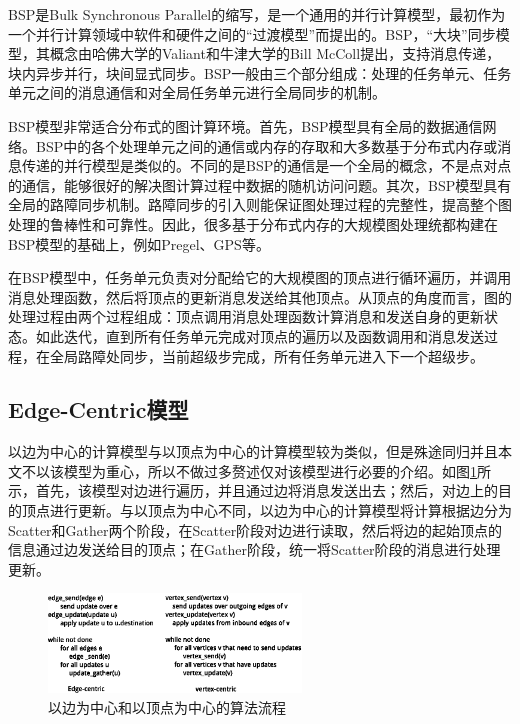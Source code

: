 BSP是Bulk Synchronous Parallel的缩写，是一个通用的并行计算模型，最初作为一个并行计算领域中软件和硬件之间的“过渡模型”而提出的。BSP，“大块”同步模型，其概念由哈佛大学的Valiant和牛津大学的Bill McColl提出，支持消息传递，块内异步并行，块间显式同步。BSP一般由三个部分组成：处理的任务单元、任务单元之间的消息通信和对全局任务单元进行全局同步的机制。

BSP模型非常适合分布式的图计算环境。首先，BSP模型具有全局的数据通信网络。BSP中的各个处理单元之间的通信或内存的存取和大多数基于分布式内存或消息传递的并行模型是类似的。不同的是BSP的通信是一个全局的概念，不是点对点的通信，能够很好的解决图计算过程中数据的随机访问问题。其次，BSP模型具有全局的路障同步机制。路障同步的引入则能保证图处理过程的完整性，提高整个图处理的鲁棒性和可靠性。因此，很多基于分布式内存的大规模图处理统都构建在BSP模型的基础上，例如Pregel、GPS等。

在BSP模型中，任务单元负责对分配给它的大规模图的顶点进行循环遍历，并调用消息处理函数，然后将顶点的更新消息发送给其他顶点。从顶点的角度而言，图的处理过程由两个过程组成：顶点调用消息处理函数计算消息和发送自身的更新状态。如此迭代，直到所有任务单元完成对顶点的遍历以及函数调用和消息发送过程，在全局路障处同步，当前超级步完成，所有任务单元进入下一个超级步。

\subsection{Edge-Centric模型}
以边为中心的计算模型\cite{roy2013x}与以顶点为中心的计算模型较为类似，但是殊途同归并且本文不以该模型为重心，所以不做过多赘述仅对该模型进行必要的介绍。如图\ref{fig:evc}所示，首先，该模型对边进行遍历，并且通过边将消息发送出去；然后，对边上的目的顶点进行更新。与以顶点为中心不同，以边为中心的计算模型将计算根据边分为Scatter和Gather两个阶段，在Scatter阶段对边进行读取，然后将边的起始顶点的信息通过边发送给目的顶点；在Gather阶段，统一将Scatter阶段的消息进行处理更新。

\begin{figure}[htbp]
\centering
\includegraphics[width=0.6\textwidth]{myfigures/edgevertexcentric.eps}
\caption{以边为中心和以顶点为中心的算法流程}\label{fig:evc}
\vspace{\baselineskip}
\end{figure}



